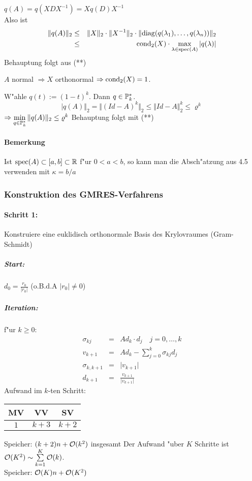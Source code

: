 \documentclass{scrartcl}
\begin{document}
\begin{Bew}
\begin{1aufz}
\item $q(A) = q(XDX^{-1}) = X q(D) X^{-1}$ \\
Also ist
\begin{eqnarray*}
\Vert q(A) \Vert_2 & \leq & \Vert X \Vert_2 \cdot \Vert X^{-1} \Vert_2 \cdot \Vert \mathrm{diag}( q(\lambda_1), \ldots, q(\lambda_n)) \Vert_2 \\
& \leq & \mathrm{cond}_2(X) \cdot \max\limits_{\lambda \in \mathrm{spec}(A)} \vert q(\lambda) \vert
\end{eqnarray*}
Behauptung folgt aus (**)
\item $A$ normal $\Rightarrow X$ orthonormal $\Rightarrow \mathrm{cond}_2(X) = 1$. 
\item W"ahle $q(t) := (1-t)^k$. Dann $q \in \mathbb{P}_k^*$.
$$\vert q(A) \Vert_2 = \Vert (Id - A)^k \Vert_2 \leq  \Vert Id - A \Vert_2^k \leq \varrho^k$$
$\Rightarrow \min\limits_{q \in \mathbb{P}_k^*} \Vert q(A) \Vert_2 \leq \varrho^k$
Behauptung folgt mit (**)
\end{1aufz}
\end{Bew}

\paragraph*{Bemerkung} 
Ist $\mathrm{spec}(A) \subset [a,b] \subset \mathbb{R}$ f"ur $0<a<b$, so kann man die Absch"atzung aus 4.5 verwenden mit $\kappa = b/a$

\subsubsection{Konstruktion des GMRES-Verfahrens}

\paragraph*{Schritt 1:}
Konstruiere eine euklidisch orthonormale Basis des Krylovraumes (Gram-Schmidt)

\subparagraph*{Start:} $d_0 = \frac{r_0}{\vert r_0 \vert }$ (o.B.d.A $\vert r_0 \vert \neq 0$)
\subparagraph*{Iteration:} f"ur $k \geq 0$:
\begin{eqnarray*}
\sigma_{kj} & = & A d_k \cdot d_j \quad j=0, \ldots, k \\
v_{k+1} & = & Ad_k - \sum\limits_{j=0}^k \sigma_{kj} d_j \\
\sigma_{k,k+1} & = & \vert v_{k+1} \vert\\
d_{k+1} & = & \frac{v_{k+1} }{\vert v_{k+1} \vert}
\end{eqnarray*}
Aufwand im $k$-ten Schritt:
\begin{tabular}{c | c | c}
MV & VV & SV \\
\hline
$1$ & $k+3$ & $k+2$
\end{tabular}
Speicher: $(k+2)n + \mathcal{O}(k^2)$ insgesamt
Der Aufwand "uber $K$ Schritte ist $\mathcal{O} (K^2) \sim \sum\limits_{k=1}^{K} \mathcal{O} (k)$. \\
Speicher: $\mathcal{O}(K) n + \mathcal{O}(K^2)$
\end{document}
